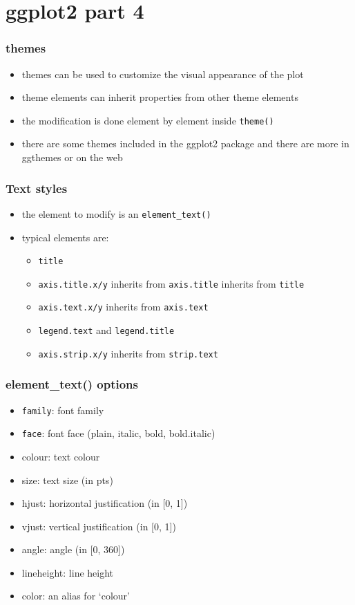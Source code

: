 \section{ggplot2 part 4}
\begin{frame}\frametitle{themes}
  \begin{itemize}
  \item themes can be used to customize the visual appearance of the plot
  \item theme elements can inherit properties from other theme elements
  \item the modification is done element by element inside \texttt{theme()}
  \item there are some themes included in the ggplot2 package and there are more in ggthemes or on the web
  \end{itemize}
\end{frame}


\begin{frame}\frametitle{Text styles}
  \begin{itemize}
  \item the element to modify is an \texttt{element\_text()}
  \item typical elements are:
    \begin{itemize}
    \item \texttt{title} 
    \item \texttt{axis.title.x/y} inherits from \texttt{axis.title} inherits from \texttt{title}
    \item \texttt{axis.text.x/y} inherits from \texttt{axis.text}
    \item \texttt{legend.text} and \texttt{legend.title}
    \item \texttt{axis.strip.x/y} inherits from \texttt{strip.text}
    \end{itemize}
  \end{itemize}
\end{frame}


\begin{frame}[allowframebreaks]\frametitle{element\_text() options}
  \begin{itemize}
    \item \texttt{family}: font family
    \item \texttt{face}: font face (plain, italic, bold, bold.italic)
    \item colour: text colour
    \item size: text size (in pts)
    \item hjust: horizontal justification (in [0, 1])
    \item vjust: vertical justification (in [0, 1])
    \item angle: angle (in [0, 360])
    \item lineheight: line height
    \item color: an alias for ‘colour’ 
  \end{itemize}
\end{frame}


